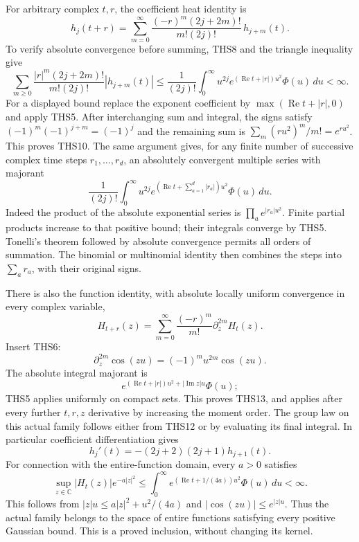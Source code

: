For arbitrary complex $t,r$, the coefficient heat identity is
\begin{equation}\tag{THS10}
 h_j(t+r)=\sum_{m=0}^{\infty}
       \frac{(-r)^m(2j+2m)!}{m!(2j)!}\,h_{j+m}(t).
\end{equation}
To verify absolute convergence before summing, THS8 and the
triangle inequality give
\begin{equation}\tag{THS11}
 \sum_{m\ge0}\frac{|r|^m(2j+2m)!}{m!(2j)!}|h_{j+m}(t)|
 \le\frac1{(2j)!}\int_0^\infty
      u^{2j}e^{(\operatorname{Re}t+|r|)u^2}\Phi(u)\,du<\infty.
\end{equation}
For a displayed bound replace the exponent coefficient by
$\max(\operatorname{Re}t+|r|,0)$ and apply THS5.
After interchanging sum and integral, the signs satisfy
$(-1)^m(-1)^{j+m}=(-1)^j$ and the remaining sum is
$\sum_m(ru^2)^m/m!=e^{ru^2}$. This proves THS10.
The same argument gives, for any finite number of successive
complex time steps $r_1,\ldots,r_d$, an absolutely convergent
multiple series with majorant
\begin{equation}\tag{THS12}
 \frac1{(2j)!}\int_0^\infty u^{2j}
 e^{(\operatorname{Re}t+\sum_{a=1}^d|r_a|)u^2}\Phi(u)\,du.
\end{equation}
Indeed the product of the absolute exponential series is
$\prod_a e^{|r_a|u^2}$. Finite partial products increase to
that positive bound; their integrals converge by THS5. Tonelli's
theorem followed by absolute convergence permits all orders of
summation. The binomial or multinomial identity then combines
the steps into $\sum_a r_a$, with their original signs.

There is also the function identity, with absolute locally
uniform convergence in every complex variable,
\begin{equation}\tag{THS13}
 H_{t+r}(z)=\sum_{m=0}^{\infty}\frac{(-r)^m}{m!}
                   \partial_z^{2m}H_t(z).
\end{equation}
Insert THS6:
\[
 \partial_z^{2m}\cos(zu)=(-1)^mu^{2m}\cos(zu).
\]
The absolute integral majorant is
\[
 e^{(\operatorname{Re}t+|r|)u^2+|\operatorname{Im}z|u}\Phi(u);
\]
THS5 applies uniformly on compact sets. This proves THS13,
and applies after every further $t,r,z$ derivative by increasing
the moment order. The group law on this actual family follows
either from THS12 or by evaluating its final integral.
In particular coefficient differentiation gives
\begin{equation}\tag{THS14}
 h_j'(t)=-(2j+2)(2j+1)h_{j+1}(t).
\end{equation}
For connection with the entire-function domain, every $a>0$
satisfies
\begin{equation}\tag{THS15}
 \sup_{z\in\mathbb C}|H_t(z)|e^{-a|z|^2}
 \le\int_0^\infty
        e^{(\operatorname{Re}t+1/(4a))u^2}\Phi(u)\,du<\infty.
\end{equation}
This follows from $|z|u\le a|z|^2+u^2/(4a)$ and
$|\cos(zu)|\le e^{|z|u}$. Thus the actual family belongs to
the space of entire functions satisfying every positive Gaussian
bound. This is a proved inclusion, without changing its kernel.

